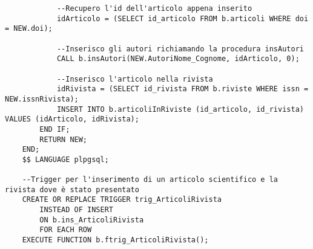 \begin{lstlisting}
            --Recupero l'id dell'articolo appena inserito
            idArticolo = (SELECT id_articolo FROM b.articoli WHERE doi = NEW.doi);
    
            --Inserisco gli autori richiamando la procedura insAutori
            CALL b.insAutori(NEW.AutoriNome_Cognome, idArticolo, 0);
    
            --Inserisco l'articolo nella rivista
            idRivista = (SELECT id_rivista FROM b.riviste WHERE issn = NEW.issnRivista);
            INSERT INTO b.articoliInRiviste (id_articolo, id_rivista) VALUES (idArticolo, idRivista);
        END IF;
        RETURN NEW;
    END;
    $$ LANGUAGE plpgsql;
    
    --Trigger per l'inserimento di un articolo scientifico e la rivista dove è stato presentato
    CREATE OR REPLACE TRIGGER trig_ArticoliRivista
        INSTEAD OF INSERT
        ON b.ins_ArticoliRivista
        FOR EACH ROW
    EXECUTE FUNCTION b.ftrig_ArticoliRivista();
\end{lstlisting}


